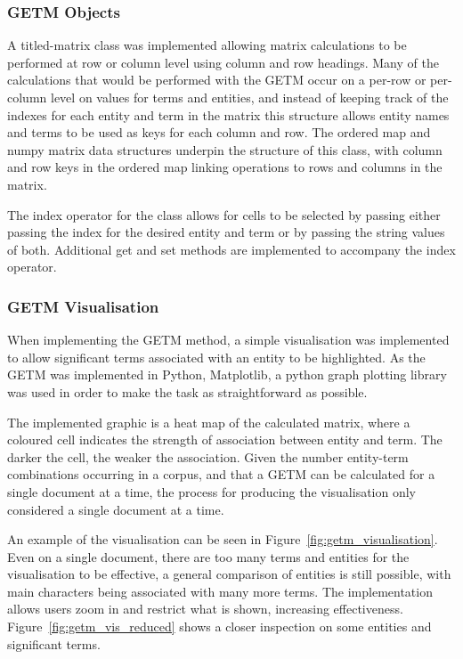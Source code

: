 \documentclass[10pt]{report}
\begin{document}
\subsubsection{GETM Objects}
A titled-matrix class was implemented allowing matrix calculations to be performed at row or column level using column and row headings. Many of the calculations that would be performed with the GETM occur on a per-row or per-column level on values for terms and entities, and instead of keeping track of the indexes for each entity and term in the matrix this structure allows entity names and terms to be used as keys for each column and row. The ordered map and numpy matrix data structures underpin the structure of this class, with column and row keys in the ordered map linking operations to rows and columns in the matrix.

The index operator for the class allows for cells to be selected by passing either passing the index for the desired entity and term or by passing the string values of both. Additional get and set methods are implemented to accompany the index operator.

\subsubsection{GETM Visualisation}
When implementing the GETM method, a simple visualisation was implemented to allow significant terms associated with an entity to be highlighted. As the GETM was implemented in Python, Matplotlib, a python graph plotting library was used in order to make the task as straightforward as possible.

The implemented graphic is a heat map of the calculated matrix, where a coloured cell indicates the strength of association between entity and term. The darker the cell, the weaker the association. Given the number entity-term combinations occurring in a corpus, and that a GETM can be calculated for a single document at a time, the process for producing the visualisation only considered a single document at a time.

An example of the visualisation can be seen in Figure~\ref{fig:getm_visualisation}. Even on a single document, there are too many terms and entities for the visualisation to be effective, a general comparison of entities is still possible, with main characters being associated with many more terms. The implementation allows users zoom in and restrict what is shown, increasing effectiveness. Figure~\ref{fig:getm_vis_reduced} shows a closer inspection on some entities and significant terms. 
\end{document}
